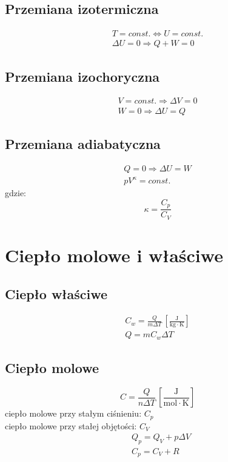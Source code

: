 \documentclass{report}
\numberwithin{equation}{chapter}
\newcommand{\unit}[1]{\,\left[\mathrm{#1}\right]}
\begin{document}
      \subsection{Przemiana izotermiczna}
        \begin{gather}
          T = const. \Leftrightarrow U = const.\\
          \Delta U = 0 \Rightarrow Q + W = 0
        \end{gather}
      \subsection{Przemiana izochoryczna}
        \begin{gather}
          V = const. \Rightarrow \Delta V = 0\\
          W = 0 \Rightarrow \Delta U = Q
        \end{gather}
      \subsection{Przemiana adiabatyczna}
        \begin{gather}
          Q = 0 \Rightarrow \Delta U = W\\
          pV^\kappa = const.
        \end{gather}
        gdzie:
        \begin{equation}
          \kappa = \frac{C_p}{C_V}
        \end{equation}
    \section{Ciepło molowe i właściwe}
      \subsection{Ciepło właściwe}
        \begin{gather}
          C_w = \frac{Q}{m\Delta T} \unit{\frac{J}{kg\cdot K}}\\
          Q = mC_w\Delta T
        \end{gather}
      \subsection{Ciepło molowe}
        \begin{equation}
          C = \frac{Q}{n\Delta T} \unit{\frac{J}{mol\cdot K}}
        \end{equation}
        ciepło molowe przy stałym ciśnieniu: $C_p$\\
        ciepło molowe przy stałej objętości: $C_V$
        \begin{align}
          &Q_p = Q_V + p\Delta V\\
          &C_p = C_V + R
        \end{align}
\end{document}
